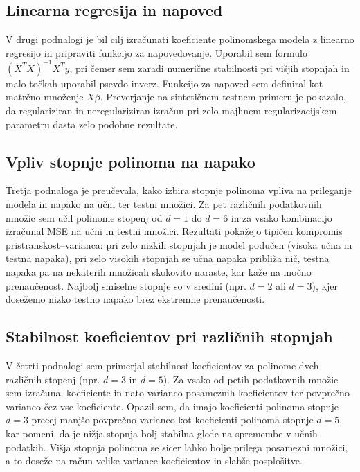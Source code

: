 \documentclass[12pt,a4paper]{article}
\begin{document}
\subsection{Linearna regresija in napoved}
V drugi podnalogi je bil cilj izračunati koeficiente polinomskega modela z linearno regresijo in pripraviti funkcijo za napovedovanje. Uporabil sem formulo $(X^T X)^{-1} X^T y$, pri čemer sem zaradi numerične stabilnosti pri višjih stopnjah in malo točkah uporabil psevdo-inverz.
Funkcijo za napoved sem definiral kot matrčno množenje $X \beta$. Preverjanje na sintetičnem testnem primeru je pokazalo, da regulariziran in neregulariziran izračun pri zelo majhnem regularizacijskem parametru dasta zelo podobne rezultate.

\subsection{Vpliv stopnje polinoma na napako}
Tretja podnaloga je preučevala, kako izbira stopnje polinoma vpliva na prileganje modela in napako na učni ter testni množici. Za pet različnih podatkovnih množic sem učil polinome stopenj od $d=1$ do $d=6$ in za vsako kombinacijo izračunal MSE na učni in testni množici.
Rezultati pokažejo tipičen kompromis pristranskost--varianca: pri zelo nizkih stopnjah je model podučen (visoka učna in testna napaka), pri zelo visokih stopnjah se učna napaka približa nič, testna napaka pa na nekaterih množicah skokovito naraste, kar kaže na močno prenaučenost. Najbolj smiselne stopnje so v sredini (npr. $d=2$ ali $d=3$), kjer dosežemo nizko testno napako brez ekstremne prenaučenosti.

\subsection{Stabilnost koeficientov pri različnih stopnjah}
V četrti podnalogi sem primerjal stabilnost koeficientov za polinome dveh različnih stopenj (npr. $d=3$ in $d=5$). Za vsako od petih podatkovnih množic sem izračunal koeficiente in nato varianco posameznih koeficientov ter povprečno varianco čez vse koeficiente.
Opazil sem, da imajo koeficienti polinoma stopnje $d=3$ precej manjšo povprečno varianco kot koeficienti polinoma stopnje $d=5$, kar pomeni, da je nižja stopnja bolj stabilna glede na spremembe v učnih podatkih. Višja stopnja polinoma se sicer lahko bolje prilega posamezni množici, a to doseže na račun velike variance koeficientov in slabše posplošitve.
\end{document}
